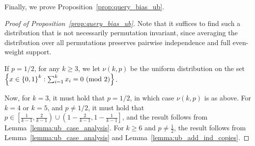 Finally, we prove Proposition~\ref{prop:query_bias_ub}.

\begin{proof}[Proof of Proposition~\ref{prop:query_bias_ub}]
	Note that it suffices to find such a distribution that is not necessarily permutation invariant, since averaging the distribution over all permutations preserves pairwise independence and full even-weight support.
	
	If $p=1/2$, for any $k\geq 3$, we let $\nu(k,p)$ be the uniform distribution on the set $\left\{  x\in\left\{ 0,1 \right\}^k : \sum_{i=1}^k x_i = 0 \textnormal{ (mod 2)} \right\}$.
	
	Now, for $k=3$, it must hold that $p=1/2$, in which case $\nu(k,p)$ is as above.
	For $k=4$ or $k=5$, and $p\not=1/2$, it must hold that $p \in \left[\frac{1}{k-1}, \frac{2}{k-1}\right)\cup \left( 1-\frac{2}{k-1}, 1-\frac{1}{k-1}\right]$, and the result follows from Lemma~\ref{lemma:ub_case_analysis}.
	For $k\geq 6$ and $p\not=\frac{1}{2}$, the result follows from Lemma~\ref{lemma:ub_case_analysis} and Lemma~\ref{lemma:ub_add_ind_copies}.
\end{proof}


